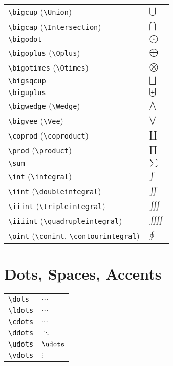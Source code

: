\documentclass[text,xhtml,itex]{internet}
\begin{document}
\begin{tabular}{ll}
\verb+\bigcup+ (\verb+\Union+)                    & \(\bigcup\) \\
\verb+\bigcap+ (\verb+\Intersection+)             & \(\bigcap\) \\
\verb+\bigodot+                              & \(\bigodot\) \\
\verb+\bigoplus+ (\verb+\Oplus+)                  & \(\bigoplus\) \\
\verb+\bigotimes+ (\verb+\Otimes+)                & \(\bigotimes\) \\
\verb+\bigsqcup+                             & \(\bigsqcup\) \\
\verb+\biguplus+                             & \(\biguplus\) \\
\verb+\bigwedge+ (\verb+\Wedge+)                  & \(\bigwedge\) \\
\verb+\bigvee+ (\verb+\Vee+)                      & \(\bigvee\) \\
\verb+\coprod+ (\verb+\coproduct+)                & \(\coprod\) \\
\verb+\prod+ (\verb+\product+)                    & \(\prod\) \\
\verb+\sum+                                  & \(\sum\) \\
\verb+\int+ (\verb+\integral+)                    & \(\int\) \\
\verb+\iint+ (\verb+\doubleintegral+)             & \(\iint\) \\
\verb+\iiint+ (\verb+\tripleintegral+)            & \(\iiint\) \\
\verb+\iiiint+ (\verb+\quadrupleintegral+)        & \(\iiiint\) \\
\verb+\oint+ (\verb+\conint+, \verb+\contourintegral+) & \(\oint\)
\end{tabular}

\section{Dots, Spaces, Accents}

\begin{tabular}{ll}
\verb+\dots+         & \(\dots\) \\
\verb+\ldots+        & \(\ldots\) \\
\verb+\cdots+        & \(\cdots\) \\
\verb+\ddots+        & \(\ddots\) \\
\verb+\udots+        & \(\udots\) \\
\verb+\vdots+        & \(\vdots\)
\end{tabular}
\end{document}
